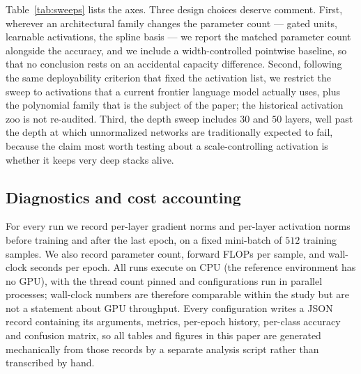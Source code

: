 Table~\ref{tab:sweeps} lists the axes. Three design choices deserve comment.
First, wherever an architectural family changes the parameter count --- gated
units, learnable activations, the spline basis --- we report the matched
parameter count alongside the accuracy, and we include a width-controlled
pointwise baseline, so that no conclusion rests on an accidental capacity
difference. Second, following the same deployability criterion that fixed the
activation list, we restrict the sweep to activations that a current frontier
language model actually uses, plus the polynomial family that is the subject
of the paper; the historical activation zoo is not re-audited. Third, the
depth sweep includes $30$ and $50$ layers, well past the depth at which
unnormalized networks are traditionally expected to fail, because the claim
most worth testing about a scale-controlling activation is whether it keeps
very deep stacks alive.

\subsection{Diagnostics and cost accounting}

For every run we record per-layer gradient norms and per-layer activation
norms before training and after the last epoch, on a fixed mini-batch of $512$
training samples. We also record parameter count, forward FLOPs per sample,
and wall-clock seconds per epoch. All runs execute on CPU (the reference
environment has no GPU), with the thread count pinned and configurations run
in parallel processes; wall-clock numbers are therefore comparable within the
study but are not a statement about GPU throughput. Every configuration writes
a JSON record containing its arguments, metrics, per-epoch history, per-class
accuracy and confusion matrix, so all tables and figures in this paper are
generated mechanically from those records by a separate analysis script
rather than transcribed by hand.
